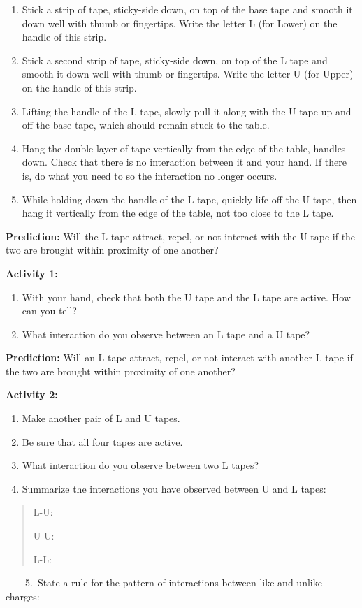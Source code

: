 \begin{enumerate}
\item Stick a strip of tape, sticky-side down, on top of the base tape and
smooth it down well with thumb or fingertips. Write the letter L (for
Lower) on the handle of this strip.
\item Stick a second strip of tape, sticky-side down, on top of the L tape
and smooth it down well with thumb or fingertips. Write the letter
U (for Upper) on the handle of this strip.
\item Lifting the handle of the L tape, slowly pull it along with the U
tape up and off the base tape, which should remain stuck to the table.
\item Hang the double layer of tape vertically from the edge of the table,
handles down. Check that there is no interaction between it and your
hand. If there is, do what you need to so the interaction no longer
occurs.
\item While holding down the handle of the L tape, quickly life off the
U tape, then hang it vertically from the edge of the table, not too
close to the L tape.
\end{enumerate}
\textbf{Prediction:} Will the L tape attract, repel, or not interact
with the U tape if the two are brought within proximity of one another?
\vspace{1in}

\textbf{Activity 1:}

\begin{enumerate}
\item With your hand, check that both the U tape and the L tape are active.
How can you tell?\vspace{15mm}

\item What interaction do you observe between an L tape and a U tape?\vspace{15mm}

\end{enumerate}
\textbf{Prediction:} Will an L tape attract, repel, or not interact
with another L tape if the two are brought within proximity of one
another?
\vspace{15mm}

\textbf{Activity 2:}

\begin{enumerate}
\item Make another pair of L and U tapes.
\item Be sure that all four tapes are active.
\item What interaction do you observe between two L tapes?\vspace{15mm}

\item Summarize the interactions you have observed between U and L tapes:
\end{enumerate}
\begin{quote}
L-U:

U-U:

L-L:
\end{quote}
~~~~5.~State a rule for the pattern of interactions between like
and unlike charges:
\vspace{20mm}

